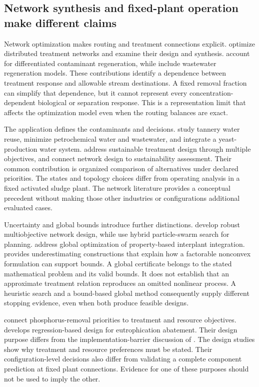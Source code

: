\subsection{Network synthesis and fixed-plant operation make different claims}

Network optimization makes routing and treatment connections explicit. \citet{Galan1998} optimize distributed treatment networks and \citet{Galan1999} examine their design and synthesis. \citet{GuelliSouza2011} account for differentiated contaminant regeneration, while \citet{YangNetwork2014} include wastewater regeneration models. These contributions identify a dependence between treatment response and allowable stream destinations. A fixed removal fraction can simplify that dependence, but it cannot represent every concentration-dependent biological or separation response. This is a representation limit that affects the optimization model even when the routing balances are exact.

The application defines the contaminants and decisions. \citet{Gutterres2010} study tannery water reuse, \citet{Hansen2018} minimize petrochemical water and wastewater, and \citet{Xu2015} integrate a yeast-production water system. \citet{PadronPaez2020} address sustainable treatment design through multiple objectives, and \citet{Aboagye2021} connect network design to sustainability assessment. Their common contribution is organized comparison of alternatives under declared priorities. The states and topology choices differ from operating analysis in a fixed activated sludge plant. The network literature provides a conceptual precedent without making those other industries or configurations additional evaluated cases.

Uncertainty and global bounds introduce further distinctions. \citet{Tosarkani2020} develop robust multiobjective network design, while \citet{Ye2019} use hybrid particle-swarm search for planning. \citet{RubioCastro2013} address global optimization of property-based interplant integration. \citet{McCormick1976} provides underestimating constructions that explain how a factorable nonconvex formulation can support bounds. A global certificate belongs to the stated mathematical problem and its valid bounds. It does not establish that an approximate treatment relation reproduces an omitted nonlinear process. A heuristic search and a bound-based global method consequently supply different stopping evidence, even when both produce feasible designs.

\citet{DamalerioRemoval2022} connect phosphorus-removal priorities to treatment and resource objectives. \citet{Selerio2022} develops regression-based design for eutrophication abatement. Their design purpose differs from the implementation-barrier discussion of \citet{DamalerioBarriers2022}. The design studies show why treatment and resource preferences must be stated. Their configuration-level decisions also differ from validating a complete component prediction at fixed plant connections. Evidence for one of these purposes should not be used to imply the other.

